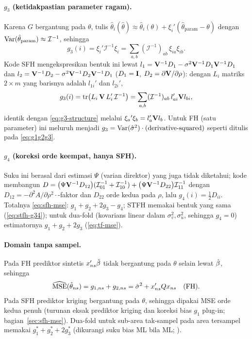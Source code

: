 \paragraph{$g_3$ (ketidakpastian parameter ragam).} Karena $G$ bergantung
pada $\theta$, tulis $\hat\theta_i(\hat\theta)\approx\hat\theta_i(\theta)
+\xi_i'(\hat\theta_{\text{param}}-\theta)$ dengan
$\operatorname{Var}(\hat\theta_{\text{param}})\approx\mathcal I^{-1}$, sehingga
\begin{equation}
  g_3(i)=\xi_i'\mathcal I^{-1}\xi_i
  =\sum_{a,b}(\mathcal I^{-1})_{ab}\,\xi_{ia}\xi_{ib}.
  \label{eq:g3-structure}
\end{equation}
Kode SFH mengekspresikan bentuk ini lewat $l_1=\mathbf{V}^{-1}D_1-\sigma^2
\mathbf{V}^{-1}D_1\mathbf{V}^{-1}D_1$ dan $l_2=\mathbf{V}^{-1}D_2-\sigma^2\mathbf{V}^{-1}D_2
\mathbf{V}^{-1}D_1$ ($D_1=\mathbf{I}$, $D_2=\partial\mathbf{V}/\partial\rho$): dengan
$L_i$ matriks $2\times m$ yang barisnya adalah $l_{1i}'$ dan $l_{2i}'$,
\begin{equation}
  g_3(i)=\operatorname{tr}\bigl(L_i\,\mathbf{V}\,L_i'\,\mathcal I^{-1}\bigr)
  =\sum_{a,b}(\mathcal I^{-1})_{ab}\,l_{ai}'\mathbf{V} l_{bi},
  \label{eq:g3-sfh}
\end{equation}
identik dengan \eqref{eq:g3-structure} melalui
$\xi_{a}{}'\xi_{b}=l_{a}'\mathbf{V} l_{b}$. Untuk FH (satu parameter) ini
meluruh menjadi $g_3=\operatorname{Var}(\hat\sigma^{2})\cdot(\text{derivative-squared})$ seperti
ditulis pada \eqref{eq:g1g2g3}.

\paragraph{$g_4$ (koreksi orde keempat, hanya SFH).} Suku ini berasal dari
estimasi $\Psi$ (varian direktor) yang juga tidak diketahui; kode
membangun $D=\bigl(\Psi\mathbf{V}^{-1}D_{12}\bigr)(\mathcal I^{-1}_{01}
+\mathcal I^{-1}_{10})+\bigl(\Psi\mathbf{V}^{-1}D_{22}\bigr)\mathcal I^{-1}_{11}$
dengan $D_{12}=-\partial^2A/\partial\rho^2\cdot$-faktor dan
$D_{22}$ orde kedua pada $\rho$, lalu $g_4(i)=\tfrac12 D_{ii}$. Totalnya
\eqref{eq:sfh-mse}: $g_1+g_2+2g_3-g_4$; STFH memakai bentuk yang sama
(\eqref{eq:stfh-g34}); untuk dua-fold (kovarians linear dalam
$\sigma_v^2,\sigma_u^2$, sehingga $g_4=0$) estimatornya $g_1+g_2+2g_3$
(\eqref{eq:tf-mse}).

\paragraph{Domain tanpa sampel.} Pada FH prediktor sintetis $x_{ns}'\hat\beta$
tidak bergantung pada $\theta$ selain lewat $\hat\beta$, sehingga
\begin{equation}
  \widehat{\mathrm{MSE}}(\hat\theta_{ns})=g_{1,ns}+g_{2,ns}=\hat\sigma^2+x_{ns}'Qx_{ns}
  \quad\text{(FH)}.
  \label{eq:g-unsampled}
\end{equation}
Pada SFH prediktor kriging bergantung pada $\theta$, sehingga dipakai MSE orde
kedua penuh (turunan eksak prediktor kriging dan koreksi bias $g_1$ plug-in;
bagian~\ref{sec:sfh-mse}). Dua-fold untuk sub-area tak-sampel pada area
tersampel memakai $g_1^\ast+g_2^\ast+2g_3^\ast$ (dikurangi suku bias ML bila
ML; ).

